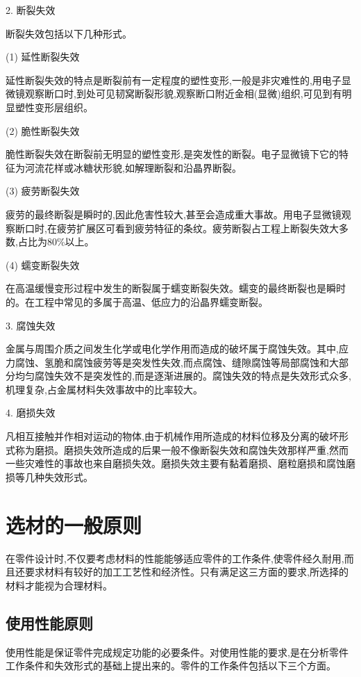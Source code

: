 \documentclass[UTF8]{ctexbook}
\newcommand{\◎}{\ensuremath{\bigcirc}}
\begin{document}
2. 断裂失效

断裂失效包括以下几种形式。

(1) 延性断裂失效

延性断裂失效的特点是断裂前有一定程度的塑性变形,一般是非灾难性的,用电子显微镜观察断口时,到处可见韧窝断裂形貌,观察断口附近金相(显微)组织,可见到有明显塑性变形层组织。

(2) 脆性断裂失效

脆性断裂失效在断裂前无明显的塑性变形,是突发性的断裂。电子显微镜下它的特征为河流花样或冰糖状形貌,如解理断裂和沿晶界断裂。

(3) 疲劳断裂失效

疲劳的最终断裂是瞬时的,因此危害性较大,甚至会造成重大事故。用电子显微镜观察断口时,在疲劳扩展区可看到疲劳特征的条纹。疲劳断裂占工程上断裂失效大多数,占比为80\%以上。

(4) 蠕变断裂失效

在高温缓慢变形过程中发生的断裂属于蠕变断裂失效。蠕变的最终断裂也是瞬时的。在工程中常见的多属于高温、低应力的沿晶界蠕变断裂。

3. 腐蚀失效

金属与周围介质之间发生化学或电化学作用而造成的破坏属于腐蚀失效。其中,应力腐蚀、氢脆和腐蚀疲劳等是突发性失效,而点腐蚀、缝隙腐蚀等局部腐蚀和大部分均匀腐蚀失效不是突发性的,而是逐渐进展的。腐蚀失效的特点是失效形式众多,机理复杂,占金属材料失效事故中的比率较大。

4. 磨损失效

凡相互接触并作相对运动的物体,由于机械作用所造成的材料位移及分离的破坏形式称为磨损。磨损失效所造成的后果一般不像断裂失效和腐蚀失效那样严重,然而一些灾难性的事故也来自磨损失效。磨损失效主要有黏着磨损、磨粒磨损和腐蚀磨损等几种失效形式。

\section{选材的一般原则}

在零件设计时,不仅要考虑材料的性能能够适应零件的工作条件,使零件经久耐用,而且还要求材料有较好的加工工艺性和经济性。只有满足这三方面的要求,所选择的材料才能视为合理材料。

\subsection{使用性能原则}

使用性能是保证零件完成规定功能的必要条件。对使用性能的要求,是在分析零件工作条件和失效形式的基础上提出来的。零件的工作条件包括以下三个方面。
\end{document}
